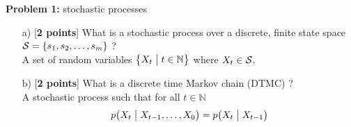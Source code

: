 
\textbf{Problem 1:} stochastic processes
\begin{itemize}
\item[a)] [\textbf{2 points}] What is a stochastic process over a discrete, finite state space $\mathcal{S} = \{ s_1, s_2, \ldots, s_m \}$ ? \\[4ex]
A set of random variables $\bigl\{ X_t \bigm| t \in \mathbb{N} \bigr\}$ where $X_t \in \mathcal{S}$.





\vspace{8ex}
\item[b)] [\textbf{2 points}] What is a discrete time Markov chain (DTMC) ? \\[4ex]
A stochastic process such that for all $t \in \mathbb{N}$
\begin{equation*}
p\bigl( X_t \bigm| X_{t-1}, \ldots, X_0 \bigr) = p\bigl( X_t \bigm| X_{t-1} \bigr) 
\end{equation*}
\end{itemize}
\newpage










